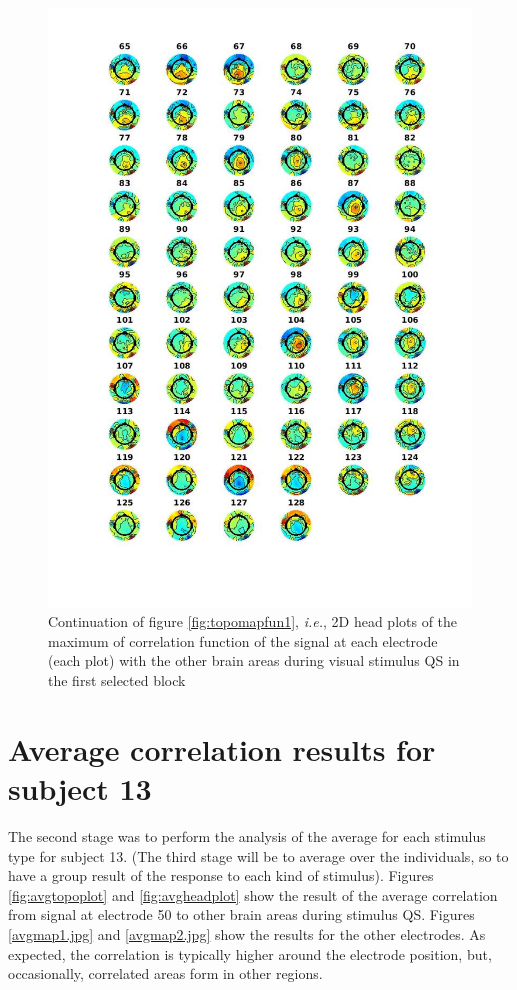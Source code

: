 \documentclass[a4paper]{article}
\begin{document}
\begin{figure}
    \centering
    \includegraphics[width=15cm]{topomapfun2.jpg}
    \caption{Continuation of figure \ref{fig:topomapfun1}, \textit{i.e.}, 2D head plots of the maximum of correlation function of the signal at each electrode (each plot) with the other brain areas during visual stimulus QS in the first selected block}
    \label{fig:topomapfun2}
\end{figure}


\section{Average correlation results for subject 13}

The second stage was to perform the analysis of the average for each stimulus type for subject 13. (The third stage will be to average over the individuals, so to have a group result of the response to each kind of stimulus). Figures \ref{fig:avgtopoplot} and \ref{fig:avgheadplot} show the result of the average correlation from signal at electrode 50 to other brain areas during stimulus QS. Figures \ref{avgmap1.jpg} and \ref{avgmap2.jpg} show the results for the other electrodes. As expected, the correlation is typically higher around the electrode position, but, occasionally, correlated areas form in other regions. 
\end{document}
